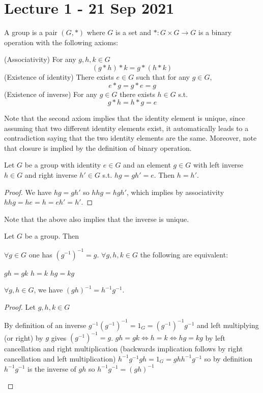 \section{Lecture 1 - 21 Sep 2021} 
\begin{definition}
  A group is a pair $(G,*)$ where $G$ is a set and $*:G\times G\to G$ is a binary
  operation with the following axioms:
  \begin{itemize}
      \ii (Associativity) For any $g,h,k\in G$
      \[(g*h)*k = g*(h*k)\]
      \ii (Existence of identity) There exists $e\in G$ such that for any $g\in G$,
      \[e*g=g*e = g\]
      \ii (Existence of inverse) For any $g\in G$ there exists $h\in G$ s.t. 
      \[g*h=h*g=e\]
  \end{itemize}
  \label{group}
\end{definition}
Note that the second axiom implies that the identity element is unique, since assuming
that two different identity elements exist, it automatically leads to a contradiction
saying that the two identity elements are the same. Moreover, note that closure is implied
by the definition of binary operation.

\begin{theorem}
  Let $G$ be a group with identity $e\in G$ and an element $g\in G$ with left inverse
  $h\in G$ and right inverse $h'\in G$ s.t. $hg = gh'=e$. Then $h=h'$.
\end{theorem}
\begin{proof}
  We have $hg=gh'$ so $hhg=hgh'$, which implies by associativity $hhg=he=h=eh'=h'$.
\end{proof}
Note that the above also implies that the inverse is unique.


\begin{theorem}
  Let $G$ be a group. Then
  \begin{itemize}
      \ii $\forall g\in G$ one has $(g^{-1})^{-1} = g$.
      \ii $\forall g,h,k\in G$ the following are equivalent:
      \begin{itemize}
        \ii $gh = gk$
        \ii $h=k$
        \ii $hg=kg$
      \end{itemize}
      \ii $\forall  g,h\in G$, we have $(gh)^{-1} = h^{-1} g^{-1}$.
  \end{itemize}
\end{theorem}

\begin{proof}
    Let $g,h,k \in G$
    \begin{itemize}
        \ii By definition of an inverse $g^{-1} (g^{-1})^{-1}=1_G=(g^{-1})^{-1}g^{-1}$ and left multiplying (or right) by $g$ gives $(g^{-1})^{-1} = g$.
        \ii $gh=gk \iff h=k \iff hg=kg$ by left cancellation and right multiplication (backwards implication follows by right cancellation and left multiplication)
        \ii $h^{-1} g^{-1} gh = 1_G = gh h^{-1} g^{-1}$ so by definition $h^{-1} g^{-1}$ is the inverse of $gh$ so $h^{-1} g^{-1} = (gh)^{-1}$
    \end{itemize}
\end{proof}

